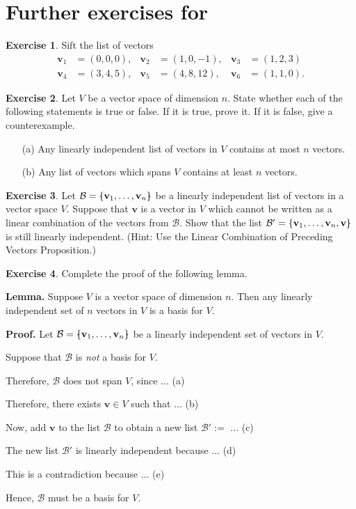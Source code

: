 \documentclass[a4paper,11pt]{book}
\theoremstyle{definition}
\newtheorem{exercise}{Exercise}
\newcommand{\ve}[1]{\mathbf{#1}}
\newcommand{\basis}[1]{{\mathcal #1}}
\newcommand{\furtherexercises}{\section*{Further exercises for \thesection}}
\newcommand{\bmark}{\raisebox{.53ex}{\rule{.2em}{.1ex}}}
\newcommand{\bopen}{{\protect\ooalign{\{\cr\hfil\bmark\hfil\cr}}}
\newcommand{\bclose}{{\protect\ooalign{\}\cr\hfil\bmark\hfil\cr}}}
\begin{document}
\furtherexercises

\begin{exercise} \label{exercise_for_new_basis}  Sift the list of vectors  
\begin{align*}
\ve{v}_1 &= (0,0,0), & \ve{v}_2 &= (1, 0, -1), & \ve{v}_3 &= (1, 2, 3) \\
\ve{v}_4 &= (3, 4, 5), & \ve{v}_5 &= (4, 8, 12), &  \ve{v}_6 &= (1, 1, 0).
\end{align*}
\end{exercise}

\begin{exercise} Let $V$ be a vector space of dimension $n$. State whether each of the following statements is true or false. If it is true, prove it. If it is false, give a counterexample. \label{true_false_span_lin_ind}
\begin{itemize}
 \item[(a)] Any linearly independent list of vectors in $V$ contains at most $n$ vectors. 
 \item[(b)] Any list of vectors which spans $V$ contains at least $n$ vectors.
\end{itemize}
\end{exercise}

\begin{exercise} Let $\basis{B} = \bopen \ve{v}_1, \ldots, \ve{v}_n \bclose$ be a linearly independent list of vectors in a vector space $V$. Suppose that $\ve{v}$ is a vector in $V$ which cannot be written as a linear combination of the vectors from $\basis{B}$. Show that the list $\basis{B}' = \bopen \ve{v}_1, \ldots, \ve{v}_n, \ve{v} \bclose$ is still linearly independent. (Hint: Use the Linear Combination of Preceding Vectors Proposition.)
\end{exercise}

\begin{exercise} \label{n_lin_ind_is_basis} Complete the proof of the following lemma.

{\bf Lemma.} Suppose $V$ is a vector space of dimension $n$. Then any linearly independent set of $n$ vectors in $V$ is a basis for $V$.

{\bf Proof.}  Let $\basis{B} = \bopen \ve{v}_1, \ldots, \ve{v}_n \bclose$ be a linearly independent set of vectors in $V$. 

Suppose that $\basis{B}$ is {\em not} a basis for $V$. 

Therefore, $\basis{B}$ does not span $V$, since ... (a) 

Therefore, there exists $\ve{v} \in V$ such that ... (b)

Now, add $\ve{v}$ to the list $\basis{B}$ to obtain a new list $\basis{B}' := $ ... (c)

The new list $\basis{B}'$ is linearly independent because ... (d)

This is a contradiction because ... (e)

Hence, $\basis{B}$ must be a basis for $V$.

\end{exercise}
\end{document}
